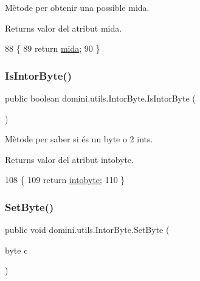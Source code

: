 Mètode per obtenir una possible mida. 

\begin{DoxyReturn}{Returns}
valor del atribut mida. 
\end{DoxyReturn}

\begin{DoxyCode}
88    \{
89       \textcolor{keywordflow}{return} \hyperlink{classdomini_1_1utils_1_1IntorByte_a6dd2ad21efcfb2bcfff716f5e04794d9}{mida};
90    \}
\end{DoxyCode}
\mbox{\label{classdomini_1_1utils_1_1IntorByte_a4fcfaf967d0c82b8147d632da4e238d0}} 
\subsubsection{\texorpdfstring{Is\+Intor\+Byte()}{IsIntorByte()}}
{\footnotesize\ttfamily public boolean domini.\+utils.\+Intor\+Byte.\+Is\+Intor\+Byte (\begin{DoxyParamCaption}{ }\end{DoxyParamCaption})\hspace{0.3cm}{\ttfamily [inline]}}



Mètode per saber si és un byte o 2 int\textquotesingle{}s. 

\begin{DoxyReturn}{Returns}
valor del atribut intobyte. 
\end{DoxyReturn}

\begin{DoxyCode}
108    \{
109       \textcolor{keywordflow}{return} \hyperlink{classdomini_1_1utils_1_1IntorByte_aee013881ecae778d25cab7c0b7655528}{intobyte};
110    \}
\end{DoxyCode}
\mbox{\label{classdomini_1_1utils_1_1IntorByte_a02677743722d43ce96904e03eb82f25b}} 
\subsubsection{\texorpdfstring{Set\+Byte()}{SetByte()}}
{\footnotesize\ttfamily public void domini.\+utils.\+Intor\+Byte.\+Set\+Byte (\begin{DoxyParamCaption}\item[{byte}]{c }\end{DoxyParamCaption})\hspace{0.3cm}{\ttfamily [inline]}}



